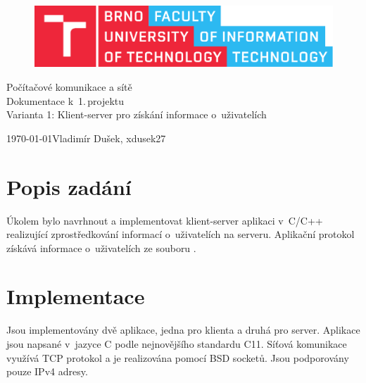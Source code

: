 \documentclass[11pt, a4paper, titlepage]{article}
\begin{document}
\begin{titlepage}
	\begin{center}
		\begin{figure}[htb]
			\centering
			\includegraphics[width=0.85\hsize]{fitlogo.pdf}
		\end{figure}


		{\LARGE Počítačové komunikace a sítě} \\
		\bigskip
		{\Huge Dokumentace k~1.\,projektu} \\
		\bigskip
		{\LARGE Varianta 1: Klient-server pro získání informace o~uživatelích}

	\end{center}
	{\Large \today \hfill Vladimír Dušek, xdusek27}
\end{titlepage}


\tableofcontents
\newpage


\section{Popis zadání}
	Úkolem bylo navrhnout a implementovat klient-server aplikaci v~C/C++ realizující zprostředkování informací o~uživatelích na serveru. Aplikační protokol získává informace o~uživatelích ze souboru .


\section{Implementace}
	Jsou implementovány dvě aplikace, jedna pro klienta a druhá pro server. Aplikace jsou napsané v~jazyce C podle nejnovějšího standardu C11. Síťová komunikace využívá TCP protokol a je realizována pomocí BSD socketů. Jsou podporovány pouze IPv4 adresy.
\end{document}
